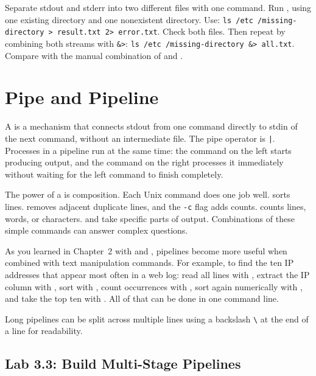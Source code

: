 \begin{challengebox}
Separate stdout and stderr into two different files with one command. Run , using one existing directory and one nonexistent directory. Use: \texttt{ls /etc /missing-directory > result.txt 2> error.txt}. Check both files. Then repeat by combining both streams with \texttt{\&>}: \texttt{ls /etc /missing-directory \&> all.txt}. Compare  with the manual combination of  and .
\end{challengebox}

\section{Pipe and Pipeline}
\label{sec:pipes}

A  is a mechanism that connects stdout from one command directly to stdin of the next command, without an intermediate file. The pipe operator is \texttt{|}. Processes in a pipeline run at the same time: the command on the left starts producing output, and the command on the right processes it immediately without waiting for the left command to finish completely.

The power of a  is composition. Each Unix command does one job well.  sorts lines.  removes adjacent duplicate lines, and the \texttt{-c} flag adds counts.  counts lines, words, or characters.  and  take specific parts of output. Combinations of these simple commands can answer complex questions.

As you learned in Chapter~2 with  and , pipelines become more useful when combined with text manipulation commands. For example, to find the ten IP addresses that appear most often in a web log: read all lines with , extract the IP column with , sort with , count occurrences with , sort again numerically with , and take the top ten with . All of that can be done in one command line.

Long pipelines can be split across multiple lines using a backslash \texttt{\textbackslash} at the end of a line for readability.

\subsection*{Lab 3.3: Build Multi-Stage Pipelines}


